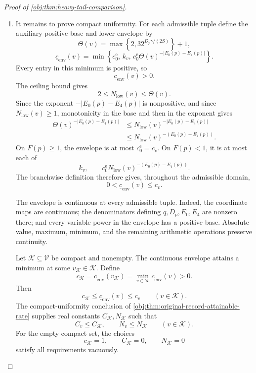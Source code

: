 \begin{proof}[Proof of \cref{obj:thm:heavy-tail-comparison}]
\begin{enumerate}
\item It remains to prove compact uniformity. For each admissible tuple define the auxiliary positive base and lower envelope by
\[
\Theta(v)
=\max\left\{2,32^{D_p\gamma/(2S)}\right\}+1,
\]
\[
\underline c_{\mathrm{env}}(v)
=\min\left\{
c_0^{\mathrm e},\,
k_v,\,
c_0^{\mathrm e}\Theta(v)^{-|E_0(p)-E_4(p)|}
\right\}.
\]
Every entry in this minimum is positive, so
\[
\underline c_{\mathrm{env}}(v)>0.
\]
The ceiling bound gives
\[
2\le N_{\mathrm{low}}(v)\le\Theta(v).
\]
Since the exponent \(-|E_0(p)-E_4(p)|\) is nonpositive, and since
\(N_{\mathrm{low}}(v)\ge1\), monotonicity in the base and then in the exponent gives
\[
\begin{aligned}
\Theta(v)^{-|E_0(p)-E_4(p)|}
&\le N_{\mathrm{low}}(v)^{-|E_0(p)-E_4(p)|}\\
&\le N_{\mathrm{low}}(v)^{-(E_0(p)-E_4(p))}.
\end{aligned}
\]
On \(F(p)\ge1\), the envelope is at most
\(c_0^{\mathrm e}=c_v\). On \(F(p)<1\), it is at most each of
\[
k_v,
\qquad
c_0^{\mathrm e}
N_{\mathrm{low}}(v)^{-(E_0(p)-E_4(p))}.
\]
The branchwise definition therefore gives, throughout the admissible domain,
\[
0<\underline c_{\mathrm{env}}(v)\le c_v.
\]

The envelope is continuous at every admissible tuple. Indeed, the coordinate maps are continuous; the denominators defining \(q,D_p,E_0,E_4\) are nonzero there; and every variable power in the envelope has a positive base. Absolute value, maximum, minimum, and the remaining arithmetic operations preserve continuity.

Let \(\mathcal K\subseteq\mathcal V\) be compact and nonempty. The continuous envelope attains a minimum at some \(v_{\mathcal K}\in\mathcal K\). Define
\[
c_{\mathcal K}
=\underline c_{\mathrm{env}}(v_{\mathcal K})
=\min_{v\in\mathcal K}\underline c_{\mathrm{env}}(v)>0.
\]
Then
\[
c_{\mathcal K}
\le\underline c_{\mathrm{env}}(v)
\le c_v
\qquad(v\in\mathcal K).
\]
The compact-uniformity conclusion of \cref{obj:thm:original-record-attainable-rate} supplies real constants \(C_{\mathcal K},N_{\mathcal K}\) such that
\[
C_v\le C_{\mathcal K},
\qquad
N_v\le N_{\mathcal K}
\qquad(v\in\mathcal K).
\]
For the empty compact set, the choices
\[
c_{\mathcal K}=1,\qquad C_{\mathcal K}=0,\qquad N_{\mathcal K}=0
\]
satisfy all requirements vacuously.


\end{enumerate}
\end{proof}
